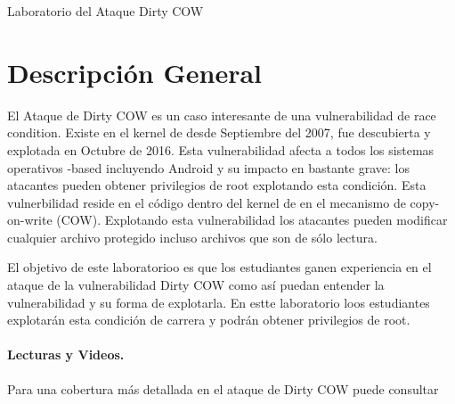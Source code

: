 
\newcommand{\commonfolder}{../../common-files}





\newcommand{\cowFigs}{./Figs}





\begin{center}
{\LARGE Laboratorio del Ataque Dirty COW }
\end{center}




\section{Descripción General}

El Ataque de Dirty COW es un caso interesante de una vulnerabilidad de race condition. Existe en el kernel de \linux desde Septiembre del 2007, fue descubierta y explotada en Octubre de 2016. 
Esta vulnerabilidad afecta a todos los sistemas operativos \linux-based incluyendo Android y su impacto en bastante grave: los atacantes pueden obtener privilegios de root explotando esta condición. Esta vulnerbilidad reside en el código dentro del kernel de \linux en el mecanismo de copy-on-write (COW). Explotando esta vulnerabilidad los atacantes pueden modificar cualquier archivo protegido incluso archivos que son de sólo lectura.

El objetivo de este laboratorioo es que los estudiantes ganen experiencia en el ataque de la vulnerabilidad Dirty COW como así puedan entender la vulnerabilidad y su forma de explotarla. En estte laboratorio loos estudiantes explotarán esta condición de carrera y podrán obtener privilegios de root.
 

\paragraph{Lecturas y Videos.}
Para una cobertura más detallada en el ataque de Dirty COW puede consultar

